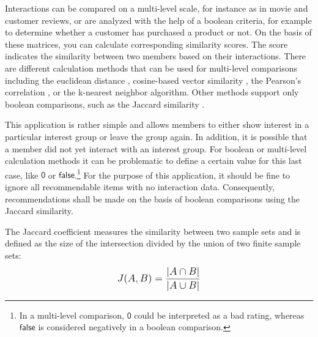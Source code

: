 \documentclass[12pt,numbers=noenddot,parskip,bibliography=totocnumbered,listof=totocnumbered,draft]{scrreprt}
\begin{document}
Interactions can be compared on a multi-level scale, for instance as in movie and customer reviews, or are analyzed with the help of a boolean criteria, for example to determine whether a customer has purchased a product or not. On the basis of these matrices, you can calculate corresponding similarity scores. The score indicates the similarity between two members based on their interactions. There are different calculation methods that can be used for multi-level comparisons including the euclidean distance \citep[p.75]{klahold2009}, cosine-based vector similarity \citep[p.71]{klahold2009}, the Pearson's correlation \citep[p.72]{klahold2009}, or the k-nearest neighbor \citep[p.76]{klahold2009} algorithm. Other methods support only boolean comparisons, such as the Jaccard similarity \citep[p.74]{klahold2009}.

This application is rather simple and allows members to either show interest in a particular interest group or leave the group again. In addition, it is possible that a member did not yet interact with an interest group. For boolean or multi-level calculation methods it can be problematic to define a certain value for this last case, like $\mathsf{0}$ or $\mathsf{false}$.\footnote{In a multi-level comparison, $\mathsf{0}$ could be interpreted as a bad rating, whereas $\mathsf{false}$ is considered negatively in a boolean comparison.} For the purpose of this application, it should be fine to ignore all recommendable items with no interaction data. Consequently, recommendations shall be made on the basis of boolean comparisons using the Jaccard similarity.

The Jaccard coefficient measures the similarity between two sample sets and is defined as the size of the intersection divided by the union of two finite sample sets:
\[
\mathlarger{J(A, B) = \frac{|A \cap B|}{|A \cup B|}}
\]
\end{document}
